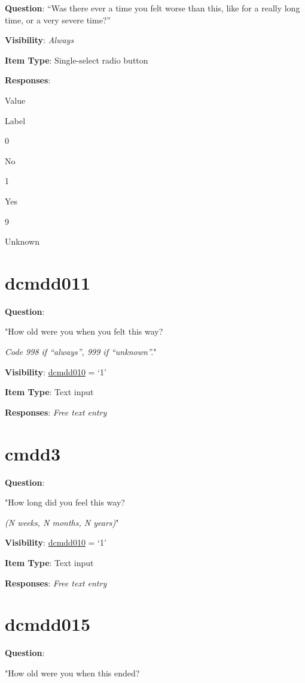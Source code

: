 \documentclass[]{book}
\begin{document}
\textbf{Question}: ``Was there ever a time you felt worse than this, like for a really long time, or a very severe time?''

\textbf{Visibility}: \emph{Always}

\textbf{Item Type}: Single-select radio button

\textbf{Responses}:

Value

Label

0

No

1

Yes

9

Unknown

\hypertarget{dcmdd011}{%
\section{dcmdd011}\label{dcmdd011}}

\textbf{Question}:

"How old were you when you felt this way?

\emph{Code 998 if ``always'', 999 if ``unknown''.}"

\textbf{Visibility}: \protect\hyperlink{dcmdd010}{dcmdd010} = `1'

\textbf{Item Type}: Text input

\textbf{Responses}: \emph{Free text entry}

\hypertarget{cmdd3}{%
\section{cmdd3}\label{cmdd3}}

\textbf{Question}:

"How long did you feel this way?

\emph{(N weeks, N months, N years)}"

\textbf{Visibility}: \protect\hyperlink{dcmdd010}{dcmdd010} = `1'

\textbf{Item Type}: Text input

\textbf{Responses}: \emph{Free text entry}

\hypertarget{dcmdd015}{%
\section{dcmdd015}\label{dcmdd015}}

\textbf{Question}:

"How old were you when this ended?
\end{document}
